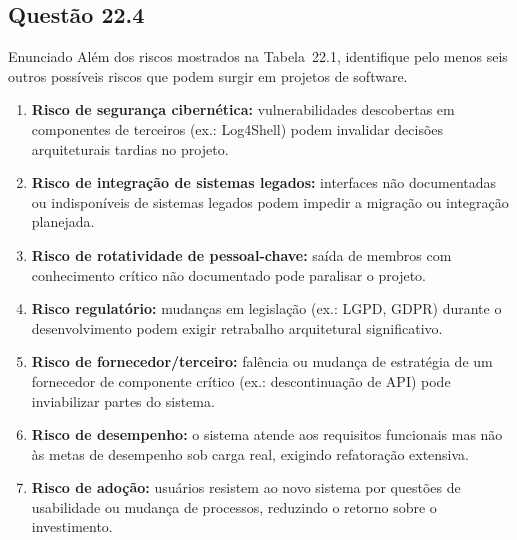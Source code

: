 \documentclass[12pt,a4paper]{article}
\begin{document}
\subsection*{Questão 22.4}
\begin{questao}{Enunciado}
Além dos riscos mostrados na Tabela~22.1, identifique pelo menos seis outros
possíveis riscos que podem surgir em projetos de software.
\end{questao}
\begin{resposta}
\begin{enumerate}[nosep]
  \item \textbf{Risco de segurança cibernética:} vulnerabilidades descobertas
        em componentes de terceiros (ex.: Log4Shell) podem invalidar decisões
        arquiteturais tardias no projeto.
  \item \textbf{Risco de integração de sistemas legados:} interfaces não
        documentadas ou indisponíveis de sistemas legados podem impedir a
        migração ou integração planejada.
  \item \textbf{Risco de rotatividade de pessoal-chave:} saída de membros
        com conhecimento crítico não documentado pode paralisar o projeto.
  \item \textbf{Risco regulatório:} mudanças em legislação (ex.: LGPD,
        GDPR) durante o desenvolvimento podem exigir retrabalho arquitetural
        significativo.
  \item \textbf{Risco de fornecedor/terceiro:} falência ou mudança de
        estratégia de um fornecedor de componente crítico (ex.: descontinuação
        de API) pode inviabilizar partes do sistema.
  \item \textbf{Risco de desempenho:} o sistema atende aos requisitos
        funcionais mas não às metas de desempenho sob carga real, exigindo
        refatoração extensiva.
  \item \textbf{Risco de adoção:} usuários resistem ao novo sistema por
        questões de usabilidade ou mudança de processos, reduzindo o retorno
        sobre o investimento.
\end{enumerate}
\end{resposta}

\end{document}
